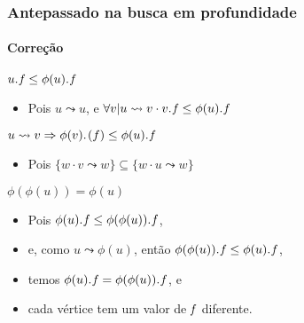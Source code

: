 \documentclass{beamer}
\begin{document}

\begin{frame}
\frametitle{Antepassado na busca em profundidade}
\framesubtitle{Correção}

\alert{$\attrib{u}{f} \le \attrib{\phi(u)}{f}$}

\begin{itemize}
\item Pois $u \leadsto u$, e $\forall v | u \leadsto v \cdot \attrib{v}{f} \le \attrib{\phi(u)}{f}$
\end{itemize}

\alert{$u \leadsto v \Rightarrow \attrib{\phi(v)}(f) \le \attrib{\phi(u)}{f}$}

\begin{itemize}
\item Pois $\{ w \cdot v \leadsto w\} \subseteq \{ w \cdot u \leadsto w\}$
\end{itemize}

\alert{$\phi(\phi(u)) = \phi(u)$}

\begin{itemize}
\item Pois $\attrib{\phi(u)}{f} \le \attrib{\phi(\phi(u))}{f}$,
\item e, como $u \leadsto \phi(u)$, então $\attrib{\phi(\phi(u))}{f} \le \attrib{\phi(u)}{f}$,
\item temos $\attrib{\phi(u)}{f} = \attrib{\phi(\phi(u))}{f}$, e
\item cada vértice tem um valor de $\id{f}$ diferente.
\end{itemize}

\end{frame}


\end{document}
